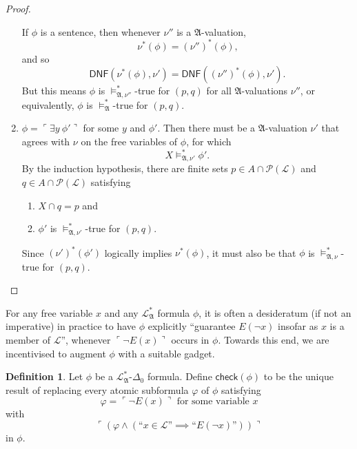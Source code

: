 \documentclass[12pt, twoside]{memoir}
\numberwithin{equation}{section}
\theoremstyle{definition}
\newtheorem{defi}[thm]{Definition}
\theoremstyle{remark}
\theoremstyle{definition}
\theoremstyle{definition}
\theoremstyle{definition}
\theoremstyle{remark}
\begin{document}
\begin{proof}
\begin{enumerate}[label=Case \arabic*:, leftmargin=50pt]
    If $\phi$ is a sentence, then whenever $\nu''$ is a $\mathfrak{A}$-valuation,
    \begin{equation*}
        \nu^*(\phi) = (\nu'')^*(\phi) \text{,}
    \end{equation*}
    and so
    \begin{equation*}
        \mathsf{DNF}(\nu^*(\phi), \nu') = \mathsf{DNF}((\nu'')^*(\phi), \nu') \text{.}
    \end{equation*}
    But this means $\phi$ is $\models^*_{\mathfrak{A}, \nu''}$-true for $(p, q)$ for all $\mathfrak{A}$-valuations $\nu''$, or equivalently, $\phi$ is $\models^*_{\mathfrak{A}}$-true for $(p, q)$.
    \item $\phi = \ulcorner \exists y \ \phi' \urcorner$ for some $y$ and $\phi'$. Then there must be a $\mathfrak{A}$-valuation $\nu'$ that agrees with $\nu$ on the free variables of $\phi$, for which $$X \models^{*}_{\mathfrak{A}, \nu'} \phi'.$$ By the induction hypothesis, there are finite sets $p \in A \cap \mathcal{P}(\mathcal{L})$ and $q \in A \cap \mathcal{P}(\mathcal{L})$ satisfying 
    \begin{enumerate}[label=(\alph*)]
        \item $X \cap q = p$ and
        \item $\phi'$ is $\models^*_{\mathfrak{A}, \nu'}$-true for $(p, q)$. 
    \end{enumerate}
    Since $(\nu')^*(\phi')$ logically implies $\nu^*(\phi)$, it must also be that $\phi$ is $\models^{*}_{\mathfrak{A}, \nu}$-true for $(p, q)$. \qedhere
\end{enumerate}
\end{proof}

For any free variable $x$ and any $\mathcal{L}^{*}_{\mathfrak{A}}$ formula $\phi$, it is often a desideratum (if not an imperative) in practice to have $\phi$ explicitly ``guarantee $E(\neg x)$ insofar as $x$ is a member of $\mathcal{L}$'', whenever $\ulcorner \neg E(x) \urcorner$ occurs in $\phi$. Towards this end, we are incentivised to augment $\phi$ with a suitable gadget.

\begin{defi}\label{check}
Let $\phi$ be a $\mathcal{L}^{*}_{\mathfrak{A}}$-$\Delta_0$ formula. Define $\mathsf{check}(\phi)$ to be the unique result of replacing every atomic subformula $\varphi$ of $\phi$ satisfying
\begin{equation*}
    \varphi = \ulcorner \neg E(x) \urcorner \text{ for some variable } x 
\end{equation*}
with 
\begin{equation*}
    \ulcorner (\varphi \wedge (\text{``} x \in \mathcal{L} \text{''} \implies \text{``} E(\neg x) \text{''})) \urcorner
\end{equation*}
in $\phi$.
\end{defi}
\end{document}
